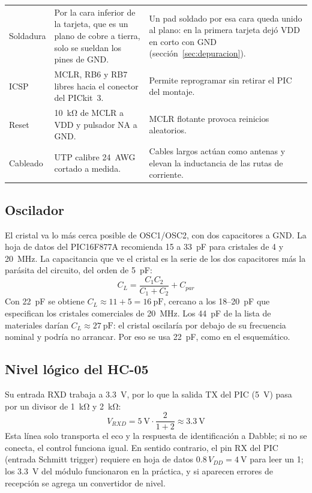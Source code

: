 \begin{table}[H]
\begin{tabularx}{\textwidth}{@{}>{\raggedright\arraybackslash}p{2.4cm} L L@{}}
    Soldadura & Por la cara inferior de la tarjeta, que es un plano de cobre a tierra, solo se sueldan los pines de GND. &
      Un pad soldado por esa cara queda unido al plano: en la primera tarjeta dejó VDD en corto con GND (sección~\ref{sec:depuracion}). \\
    ICSP & MCLR, RB6 y RB7 libres hacia el conector del PICkit~3. &
      Permite reprogramar sin retirar el PIC del montaje. \\
    Reset & \SI{10}{\kilo\ohm} de MCLR a VDD y pulsador NA a GND. &
      MCLR flotante provoca reinicios aleatorios. \\
    Cableado & UTP calibre 24~AWG cortado a medida. &
      Cables largos actúan como antenas y elevan la inductancia de las rutas de corriente. \\
    \bottomrule
  \end{tabularx}
\end{table}

\subsection{Oscilador}

El cristal va lo más cerca posible de OSC1/OSC2, con dos capacitores a GND. La
hoja de datos del PIC16F877A recomienda 15 a \SI{33}{\pico\farad} para
cristales de 4 y \SI{20}{\mega\hertz}. La capacitancia que ve el cristal es la
serie de los dos capacitores más la parásita del circuito, del orden de
\SI{5}{\pico\farad}:
\begin{equation}
  C_L = \frac{C_1 C_2}{C_1 + C_2} + C_{par}
\end{equation}
Con \SI{22}{\pico\farad} se obtiene $C_L \approx 11 + 5 = \SI{16}{\pico\farad}$,
cercano a los 18--\SI{20}{\pico\farad} que especifican los cristales
comerciales de \SI{20}{\mega\hertz}. Los \SI{44}{\pico\farad} de la lista de
materiales darían $C_L \approx \SI{27}{\pico\farad}$: el cristal oscilaría por
debajo de su frecuencia nominal y podría no arrancar. Por eso se usa
\SI{22}{\pico\farad}, como en el esquemático.

\subsection{Nivel lógico del HC-05}

Su entrada RXD trabaja a \SI{3.3}{\volt}, por lo que la salida TX del PIC
(\SI{5}{\volt}) pasa por un divisor de \SI{1}{\kilo\ohm} y \SI{2}{\kilo\ohm}:
\begin{equation}
  V_{RXD} = \SI{5}{\volt}\cdot\frac{2}{1+2} \approx \SI{3.3}{\volt}
\end{equation}
Esta línea solo transporta el eco y la respuesta de identificación a Dabble; si
no se conecta, el control funciona igual. En sentido contrario, el pin RX del
PIC (entrada Schmitt trigger) requiere en hoja de datos $0.8\,V_{DD} =
\SI{4}{\volt}$ para leer un 1; los \SI{3.3}{\volt} del módulo funcionaron en la
práctica, y si aparecen errores de recepción se agrega un convertidor de nivel.

